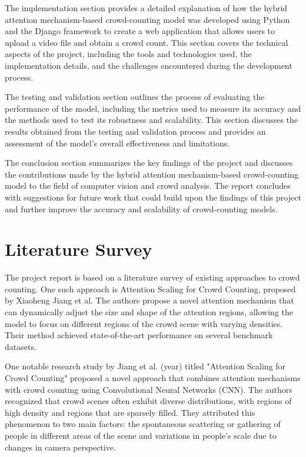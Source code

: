 \documentclass[12pt]{report}
\begin{document}
The implementation section provides a detailed explanation of how the hybrid attention mechanism-based crowd-counting model was developed using Python and the Django framework to create a web application that allows users to upload a video file and obtain a crowd count. This section covers the technical aspects of the project, including the tools and technologies used, the implementation details, and the challenges encountered during the development process.
\newline

The testing and validation section outlines the process of evaluating the performance of the model, including the metrics used to measure its accuracy and the methods used to test its robustness and scalability. This section discusses the results obtained from the testing and validation process and provides an assessment of the model's overall effectiveness and limitations.
\newline

The conclusion section summarizes the key findings of the project and discusses the contributions made by the hybrid attention mechanism-based crowd-counting model to the field of computer vision and crowd analysis. The report concludes with suggestions for future work that could build upon the findings of this project and further improve the accuracy and scalability of crowd-counting models.
\newline



\chapter{Literature Survey}

The project report is based on a literature survey of existing approaches to crowd counting. One such approach is Attention Scaling for Crowd Counting, proposed by Xiaoheng Jiang et al. The authors propose a novel attention mechanism that can dynamically adjust the size and shape of the attention regions, allowing the model to focus on different regions of the crowd scene with varying densities. Their method achieved state-of-the-art performance on several benchmark datasets.
\newline

One notable research study by Jiang et al. (year) titled "Attention Scaling for Crowd Counting" proposed a novel approach that combines attention mechanisms with crowd counting using Convolutional Neural Networks (CNN). The authors recognized that crowd scenes often exhibit diverse distributions, with regions of high density and regions that are sparsely filled. They attributed this phenomenon to two main factors: the spontaneous scattering or gathering of people in different areas of the scene and variations in people's scale due to changes in camera perspective.
\newline
\end{document}
